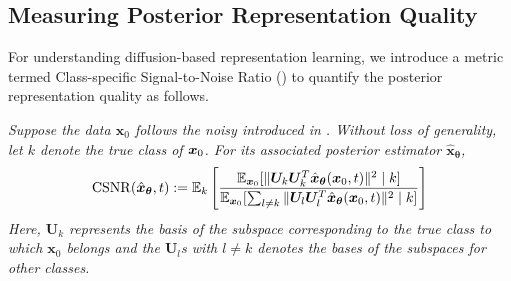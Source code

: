 \subsection{Measuring Posterior Representation Quality}\label{subsec:rep-quality}




For understanding diffusion-based representation learning, we introduce a metric termed Class-specific Signal-to-Noise Ratio (\CSNR) to quantify the posterior representation quality as follows.

\begin{definition}
\emph{Suppose the data $\bm x_0$ follows the noisy \MoLRG\;introduced in . Without loss of generality, let $k$ denote the true class of $\bm x_0$. For its associated posterior estimator $\hat{\bm x}_{\bm \theta}$,} %
\begin{align*}%
    \mathrm{CSNR}(\hat{\bm x}_{\bm \theta},t) := \E_k \left[\frac{\E_{\bm x_0}[\|\bm U_k\bm U_k^T\hat{\bm x}_{\bm \theta}(\bm x_0, t)\|^2 \mid k ] }{\E_{\bm x_0}[\sum_{l\neq k}\|\bm U_l\bm U_l^T\hat{\bm x}_{\bm \theta}(\bm x_0, t)\|^2 \mid k ]}\right]
\end{align*}
\emph{Here, $\bm U_k$ represents the basis of the subspace corresponding to the true class to which $\bm x_0$ belongs and the $\bm U_l$s with $l \neq k$ denotes the bases of the subspaces for other classes. }
\end{definition}




